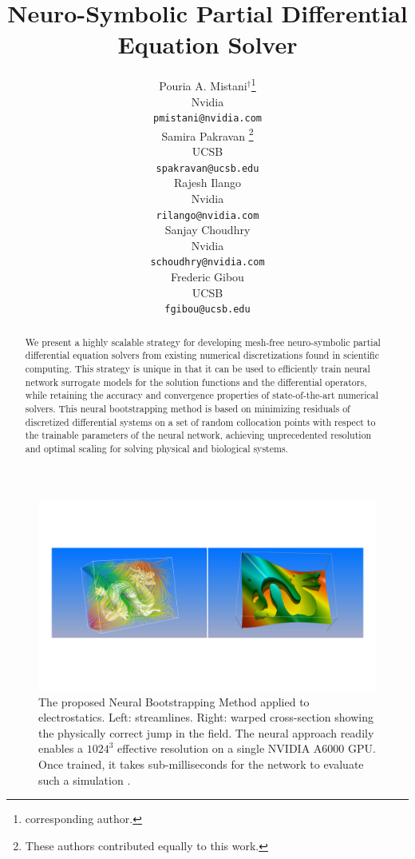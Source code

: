 \documentclass{article}
\title{Neuro-Symbolic Partial Differential Equation Solver}
\author{
  Pouria A. Mistani$^\dagger$\thanks{corresponding author.} \\
  Nvidia \\
  \texttt{pmistani@nvidia.com} \\
  \And
  Samira Pakravan \thanks{These authors contributed equally to this work.}\\
  UCSB \\
  \texttt{spakravan@ucsb.edu} \\
  \And
  Rajesh Ilango \\
  Nvidia \\
  \texttt{rilango@nvidia.com} \\
  \AND
  Sanjay Choudhry \\
  Nvidia \\
  \texttt{schoudhry@nvidia.com} \\
  \And
  Frederic Gibou \\
  UCSB \\
  \texttt{fgibou@ucsb.edu} \\
}
\begin{document}
\maketitle

\vspace{-0.5cm}
\begin{figure}[h]
\centering
\includegraphics[width=0.99\linewidth]{figures/twoDragons.pdf}
\caption{The proposed Neural Bootstrapping Method applied to electrostatics. Left: streamlines. Right: warped cross-section showing the physically correct jump in the field. The neural approach readily enables a $1024^3$ effective resolution on a single NVIDIA A6000 GPU. Once trained, it takes sub-milliseconds for the network to evaluate such a simulation \cite{tiny-cuda-nn}.}
\label{fig:dragon}
\end{figure}

\begin{abstract}
 
  We present a highly scalable strategy for developing mesh-free neuro-symbolic partial differential equation solvers from existing numerical discretizations found in scientific computing. This strategy is unique in that it can be used to efficiently train neural network surrogate models for the solution functions and the differential operators, while retaining the accuracy and convergence properties of state-of-the-art numerical solvers. This neural bootstrapping method is based on minimizing residuals of discretized differential systems on a set of random collocation points with respect to the trainable parameters of the neural network, achieving unprecedented resolution and optimal scaling for solving physical and biological systems.
\end{abstract}

\end{document}
